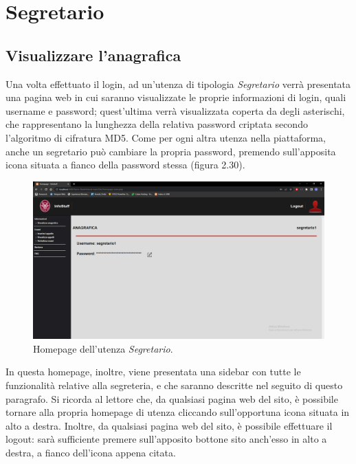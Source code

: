 \documentclass [a4paper,11pt]{book}
\begin{document}
\medskip
\medskip

\section{Segretario}

\subsection{Visualizzare l'anagrafica}

Una volta effettuato il login, ad un'utenza di tipologia \emph{Segretario} verrà presentata una pagina web in cui saranno visualizzate le proprie informazioni di login, quali username e password; quest'ultima verrà visualizzata coperta da degli asterischi, che rappresentano la lunghezza della relativa password criptata secondo l'algoritmo di cifratura MD5. Come per ogni altra utenza nella piattaforma, anche un segretario può cambiare la propria password, premendo sull'apposita icona situata a fianco della password stessa (figura 2.30). 

\begin{figure}
\centering
\includegraphics[scale=0.3]{figura2-30.png}
\caption{Homepage dell'utenza \emph{Segretario}.}
\end{figure}

In questa homepage, inoltre, viene presentata una sidebar con tutte le funzionalità relative alla segreteria, e che saranno descritte nel seguito di questo paragrafo. Si ricorda al lettore che, da qualsiasi pagina web del sito, è possibile tornare alla propria homepage di utenza cliccando sull'opportuna icona situata in alto a destra. Inoltre, da qualsiasi pagina web del sito, è possibile effettuare il logout: sarà sufficiente premere sull'apposito bottone sito anch'esso in alto a destra, a fianco dell'icona appena citata.
\end{document}
